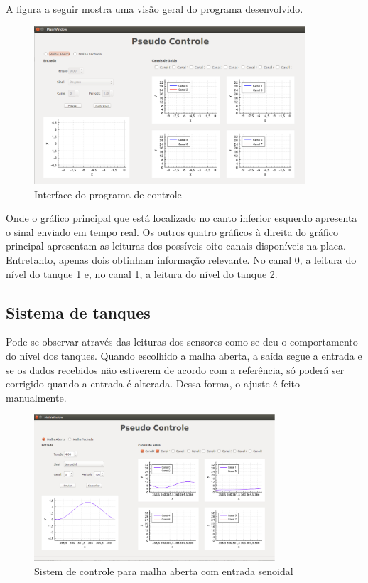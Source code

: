 \documentclass[a4paper,12pt]{article}
\begin{document}
A figura a seguir mostra uma visão geral do programa desenvolvido.

\begin{figure}[!h]
\centering
\includegraphics[width=0.9\textwidth]{prog-geral.eps}
\caption{Interface do programa de controle}
\label{Interface}
\end{figure}
\hspace{4ex}
Onde o gráfico principal que está localizado no canto inferior esquerdo apresenta o sinal enviado em tempo real. Os outros quatro gráficos à direita do gráfico principal apresentam as leituras dos possíveis oito canais disponíveis na placa. Entretanto, apenas dois obtinham informação relevante. No canal 0, a leitura do nível do tanque 1 e, no canal 1, a leitura do nível do tanque 2.



\newpage
\subsection{Sistema de tanques}
\hspace{4ex}
Pode-se observar através das leituras dos sensores como se deu o comportamento do nível dos tanques. Quando escolhido a malha aberta, a saída segue a entrada e se os dados recebidos não estiverem de acordo com a referência, só poderá ser corrigido quando a entrada é alterada. Dessa forma, o ajuste é feito manualmente. 

\begin{figure}[!h]
\centering
\includegraphics[width=0.8\textwidth]{maberta-sen-4.eps}
\caption{Sistem de controle para malha aberta com entrada senoidal}
\label{Entrada Senoidal - aberta}
\end{figure}
  
\end{document}
